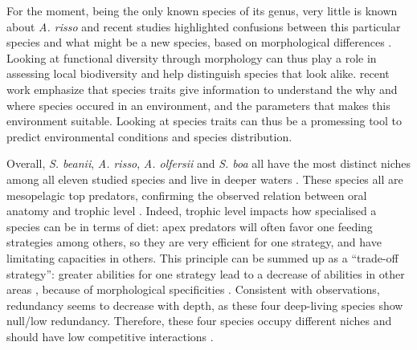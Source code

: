 For the moment, being the only known species of its genus, very little is known about \textit{A. risso} and recent studies highlighted confusions between this particular species and what might be a new species, based on morphological differences \citep{ho2019}. Looking at functional diversity through morphology can thus play a role in assessing local biodiversity and help distinguish species that look alike. \citet{vesk2021} recent work emphasize that species traits give information to understand the why and where species occured in an environment, and the parameters that makes this environment suitable. Looking at species traits can thus be a promessing tool to predict environmental conditions and species distribution.  


 

Overall, \textit{S. beanii}, \textit{A. risso}, \textit{A. olfersii} and \textit{S. boa} all have the most distinct niches among all eleven studied species and live in deeper waters \citep{froese2019}. These species all are mesopelagic top predators, confirming the observed relation between oral anatomy and trophic level \citep{colborne2013,wainwright1995}. Indeed, trophic level impacts how specialised a species can be in terms of diet: apex predators will often favor one feeding strategies among others, so they are very efficient for one strategy, and have limitating capacities in others. This principle can be summed up as a ``trade-off strategy'': greater abilities for one strategy lead to a decrease of abilities in other areas \citet{norton1995}, because of morphological specificities \citep{nagelkerke2018}. Consistent with \citet{farre2016} observations, redundancy seems to decrease with depth, as these four deep-living species show null/low redundancy. Therefore, these four species occupy different niches and should have low competitive interactions \citep{mouillot2005}. 

